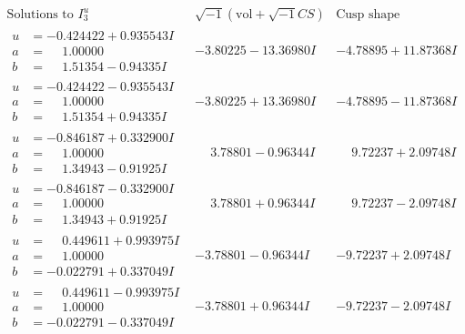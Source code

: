 \documentclass[1p]{elsarticle_modified}
\theoremstyle{definition}
\newcommand{\I}{\sqrt{-1}}
\begin{document}
$$\begin{array}{c|c|c}  
\text{Solutions to }I^u_{3}& \I (\text{vol} + \sqrt{-1}CS) & \text{Cusp shape}\\
 \hline 
\begin{aligned}
u &= -0.424422 + 0.935543 I \\
a &= \phantom{-}1.00000\phantom{ +0.000000I} \\
b &= \phantom{-}1.51354 - 0.94335 I\end{aligned}
 & -3.80225 - 13.36980 I & -4.78895 + 11.87368 I \\ \hline\begin{aligned}
u &= -0.424422 - 0.935543 I \\
a &= \phantom{-}1.00000\phantom{ +0.000000I} \\
b &= \phantom{-}1.51354 + 0.94335 I\end{aligned}
 & -3.80225 + 13.36980 I & -4.78895 - 11.87368 I \\ \hline\begin{aligned}
u &= -0.846187 + 0.332900 I \\
a &= \phantom{-}1.00000\phantom{ +0.000000I} \\
b &= \phantom{-}1.34943 - 0.91925 I\end{aligned}
 & \phantom{-}3.78801 - 0.96344 I & \phantom{-}9.72237 + 2.09748 I \\ \hline\begin{aligned}
u &= -0.846187 - 0.332900 I \\
a &= \phantom{-}1.00000\phantom{ +0.000000I} \\
b &= \phantom{-}1.34943 + 0.91925 I\end{aligned}
 & \phantom{-}3.78801 + 0.96344 I & \phantom{-}9.72237 - 2.09748 I \\ \hline\begin{aligned}
u &= \phantom{-}0.449611 + 0.993975 I \\
a &= \phantom{-}1.00000\phantom{ +0.000000I} \\
b &= -0.022791 + 0.337049 I\end{aligned}
 & -3.78801 - 0.96344 I & -9.72237 + 2.09748 I \\ \hline\begin{aligned}
u &= \phantom{-}0.449611 - 0.993975 I \\
a &= \phantom{-}1.00000\phantom{ +0.000000I} \\
b &= -0.022791 - 0.337049 I\end{aligned}
 & -3.78801 + 0.96344 I & -9.72237 - 2.09748 I \\ \hline\begin{aligned}

\end{aligned}
\end{array}$$
\end{document}
